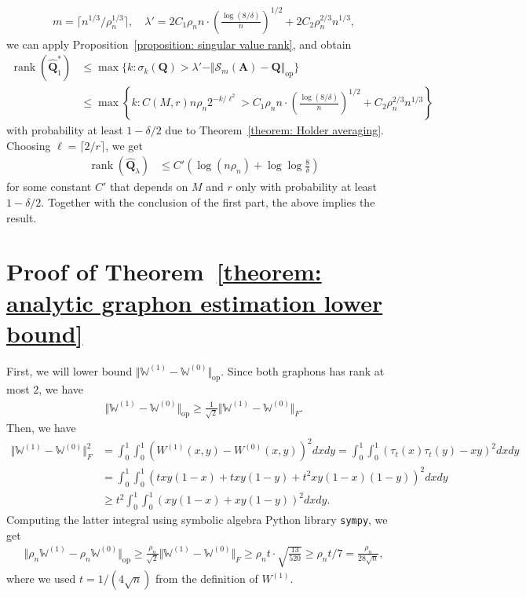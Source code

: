 \documentclass[11pt]{article}
\newcommand{\op}{\mathrm{op}}
\newcommand{\bA}{\bm{A}}
\newcommand{\bQ}{\bm{Q}}
\newcommand{\bbW}{\mathbb{W}}
\newcommand{\<}{\langle}
\renewcommand{\>}{\rangle}
\newcommand{\cS}{\mathcal{S}}
\DeclareMathOperator{\rank}{rank}
\theoremstyle{plain}
\theoremstyle{definition}
\theoremstyle{remark}
\begin{document}
{\begin{align*}
    m = \lceil n^{1/3} / \rho_n^{1/3} \rceil, \quad \lambda' = 2C_1 \rho_n n \cdot \left ( \frac{\log(8/\delta)}{n} \right )^{1/2}  + 2C_2\rho_n^{2/3} n^{1/3},
\end{align*}
we can apply Proposition~\ref{proposition: singular value rank}, and obtain
\begin{align*}
    \rank(\widehat{\bQ}^*_1) & \le \max \{k: \sigma_k(\bQ) > \lambda' - \Vert \cS_m(\bA) - \bQ \Vert_{\op} \} \\
    & \le \max \left \{ k : C(M, r) n \rho_n 2^{- k / \ell^2} > C_1 \rho_n n \cdot \left ( \frac{\log(8/\delta)}{n} \right )^{1/2}  + C_2\rho_n^{2/3} n^{1/3} \right \}
\end{align*}
with probability at least $1 - \delta/2$ due to Theorem~\ref{theorem: Holder averaging}. Choosing $\ell = \lceil 2 / r \rceil$, we get
\begin{align*}
	\rank(\widehat{\bQ}_\lambda) & \leq C' \left ( \log (n \rho_n) + \log \log \frac{8}{\delta} \right )
\end{align*}
for some constant $C'$ that depends on $M$ and $r$ only with probability at least $1 - \delta/2$. Together with the conclusion of the first part, the above implies the result.

\section{Proof of Theorem~\ref{theorem: analytic graphon estimation lower bound}}
\label{section: analytic graphon lower bound proof}

First, we will lower bound $\Vert \bbW^{(1)} - \bbW^{(0)} \Vert_{\op}$. Since both graphons has rank at most $2$, we have
\begin{align*}
    \Vert \bbW^{(1)} - \bbW^{(0)} \Vert_{\op} \ge \frac{1}{\sqrt{2}} \Vert \bbW^{(1)} - \bbW^{(0)} \Vert_{F}. 
\end{align*}
Then, we have
\begin{align*}
    \Vert \bbW^{(1)} - \bbW^{(0)} \Vert_{F}^2 & = \int_0^1 \int_0^1 (W^{(1)}(x, y) - W^{(0)}(x, y))^2 dx dy = \int_0^1 \int_0^1 (\tau_t(x) \tau_t(y) - xy )^2 dx dy \\
    & = \int_0^1 \int_0^1 (t x y (1 - x) + t xy (1 - y) + t^2 xy(1 -x )(1 - y))^2 dx dy \\
    & \ge t^2 \int_0^1 \int_0^1 ( x y (1 - x) +  xy (1 - y))^2 dx dy.
\end{align*}
Computing the latter integral using symbolic algebra Python library \texttt{sympy}, we get
\begin{align*}
     \Vert \rho_n \bbW^{(1)} - \rho_n \bbW^{(0)} \Vert_{\op} \ge \frac{\rho_n}{\sqrt{2}}\Vert \bbW^{(1)} - \bbW^{(0)} \Vert_{F} \ge \rho_n t \cdot \sqrt{\frac{13}{520}} \ge \rho_n t/7 = \frac{\rho_n}{28 \sqrt{n}},
\end{align*}
where we used $t = 1/(4 \sqrt{n})$ from the definition of $W^{(1)}$.

}
\end{document}
